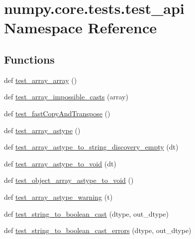 \hypertarget{namespacenumpy_1_1core_1_1tests_1_1test__api}{}\section{numpy.\+core.\+tests.\+test\+\_\+api Namespace Reference}
\label{namespacenumpy_1_1core_1_1tests_1_1test__api}
\subsection*{Functions}
\begin{DoxyCompactItemize}
\item 
def \hyperlink{namespacenumpy_1_1core_1_1tests_1_1test__api_a3e0c912b4887f9acbb048700ca9f8e89}{test\+\_\+array\+\_\+array} ()
\item 
def \hyperlink{namespacenumpy_1_1core_1_1tests_1_1test__api_aff09d64006b056b8042640ea60d646f9}{test\+\_\+array\+\_\+impossible\+\_\+casts} (array)
\item 
def \hyperlink{namespacenumpy_1_1core_1_1tests_1_1test__api_a9bbb049b8714f3f89224639b32c3a85c}{test\+\_\+fast\+Copy\+And\+Transpose} ()
\item 
def \hyperlink{namespacenumpy_1_1core_1_1tests_1_1test__api_a0980ed3f1ae45530a61ca08a7c5904d4}{test\+\_\+array\+\_\+astype} ()
\item 
def \hyperlink{namespacenumpy_1_1core_1_1tests_1_1test__api_a29c5178dc9b075b7af102d26bb6791c4}{test\+\_\+array\+\_\+astype\+\_\+to\+\_\+string\+\_\+discovery\+\_\+empty} (dt)
\item 
def \hyperlink{namespacenumpy_1_1core_1_1tests_1_1test__api_af663734183eb4088e2e6be01485c601a}{test\+\_\+array\+\_\+astype\+\_\+to\+\_\+void} (dt)
\item 
def \hyperlink{namespacenumpy_1_1core_1_1tests_1_1test__api_ac57cbfd76d51fa7a242a5f159dda9486}{test\+\_\+object\+\_\+array\+\_\+astype\+\_\+to\+\_\+void} ()
\item 
def \hyperlink{namespacenumpy_1_1core_1_1tests_1_1test__api_a4a3090576baf675088cd094289bc1cc9}{test\+\_\+array\+\_\+astype\+\_\+warning} (t)
\item 
def \hyperlink{namespacenumpy_1_1core_1_1tests_1_1test__api_a5635f7445b55639e015951f5ddec7881}{test\+\_\+string\+\_\+to\+\_\+boolean\+\_\+cast} (dtype, out\+\_\+dtype)
\item 
def \hyperlink{namespacenumpy_1_1core_1_1tests_1_1test__api_a6fd9d1e3af28cae8344a5fb74caf60ba}{test\+\_\+string\+\_\+to\+\_\+boolean\+\_\+cast\+\_\+errors} (dtype, out\+\_\+dtype)

\end{DoxyCompactItemize}
